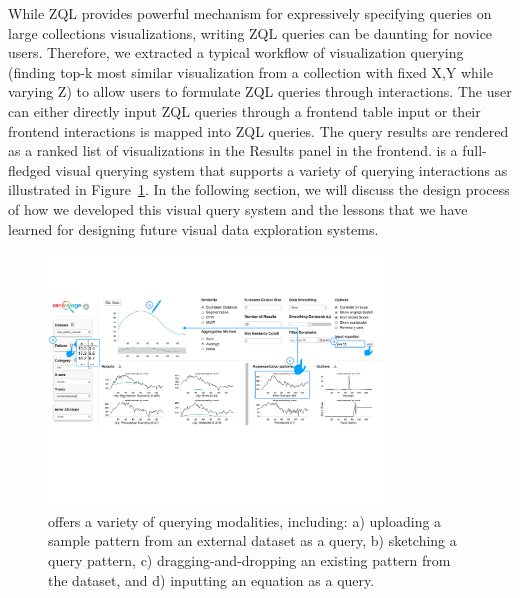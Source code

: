 \par While ZQL provides powerful mechanism for expressively specifying queries on large collections visualizations, writing ZQL queries can be daunting for novice users. Therefore, we extracted a typical workflow of visualization querying (finding top-k most similar visualization from a collection with fixed X,Y while varying Z) to allow users to formulate ZQL queries through interactions. The user can either directly input ZQL queries through a frontend table input or their frontend interactions is mapped into ZQL queries. The query results are rendered as a ranked list of visualizations in the Results panel in the frontend. \zv is a full-fledged visual querying system that supports a variety of querying interactions as illustrated in Figure~\ref{fig:modalities}. In the following section, we will discuss the design process of how we developed this visual query system and the lessons that we have learned for designing future visual data exploration systems.

\begin{figure}[h!]
\label{fig:modalities}
\centering
\includegraphics[width=0.8\textwidth]{figures/modalities.pdf}
\caption{\zv offers a variety of querying modalities, including: a) uploading a sample pattern from an external dataset as a query, b) sketching a query pattern, c) dragging-and-dropping an existing pattern from the dataset, and d) inputting an equation as a query.}
\end{figure}
